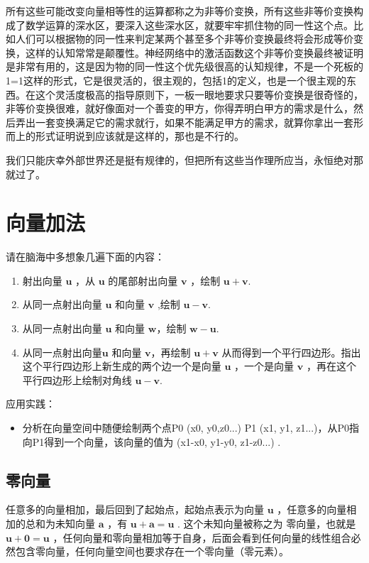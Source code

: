 \documentclass[12pt,oneside]{book}
\begin{document}
所有这些可能改变向量相等性的运算都称之为非等价变换，所有这些非等价变换构成了数学运算的深水区，要深入这些深水区，就要牢牢抓住物的同一性这个点。比如人们可以根据物的同一性来判定某两个甚至多个非等价变换最终将会形成等价变换，这样的认知常常是颠覆性。神经网络中的激活函数这个非等价变换最终被证明是非常有用的，这是因为物的同一性这个优先级很高的认知规律，不是一个死板的1=1这样的形式，它是很灵活的，很主观的，包括1的定义，也是一个很主观的东西。在这个灵活度极高的指导原则下，一板一眼地要求只要等价变换是很奇怪的，非等价变换很难，就好像面对一个善变的甲方，你得弄明白甲方的需求是什么，然后弄出一套变换满足它的需求就行，如果不能满足甲方的需求，就算你拿出一套形而上的形式证明说到应该就是这样的，那也是不行的。

我们只能庆幸外部世界还是挺有规律的，但把所有这些当作理所应当，永恒绝对那就过了。



\section{向量加法}
请在脑海中多想象几遍下面的内容：

\begin{enumerate}
\item 射出向量 $\boldsymbol{u}$ ，从 $\boldsymbol{u}$ 的尾部射出向量  $\boldsymbol{v}$  ，绘制  $\boldsymbol{u} +\boldsymbol{v} $.
\item 从同一点射出向量 $\boldsymbol{u}$ 和向量 $\boldsymbol{v}$ ,绘制  $\boldsymbol{u} - \boldsymbol{v} $.
\item 从同一点射出向量 $\boldsymbol{u}$ 和向量 $\boldsymbol{w}$，绘制 $\boldsymbol{w} - \boldsymbol{u} $.
\item 从同一点射出向量$\boldsymbol{u}$ 和向量 $\boldsymbol{v}$，再绘制 $\boldsymbol{u} +\boldsymbol{v} $ 从而得到一个平行四边形。指出这个平行四边形上新生成的两个边一个是向量 $\boldsymbol{u}$ ，一个是向量 $\boldsymbol{v}$ ，再在这个平行四边形上绘制对角线 $\boldsymbol{u} -\boldsymbol{v} $.
\end{enumerate}

应用实践：
\begin{itemize}
\item 分析在向量空间中随便绘制两个点P0 (x0, y0,z0...) P1 (x1, y1, z1...)，从P0指向P1得到一个向量，该向量的值为 (x1-x0, y1-y0, z1-z0...) .
\end{itemize}

\subsection{零向量}
任意多的向量相加，最后回到了起始点，起始点表示为向量 $\boldsymbol{u}$ ，任意多的向量相加的总和为未知向量 $\boldsymbol{a}$ ，有 $\boldsymbol{u} + \boldsymbol{a} = \boldsymbol{u}$ . 这个未知向量被称之为 零向量，也就是  $\boldsymbol{u} + \boldsymbol{0} = \boldsymbol{u}$ ，任何向量和零向量相加等于自身，后面会看到任何向量的线性组合必然包含零向量，任何向量空间也要求存在一个零向量（零元素）。
\end{document}
